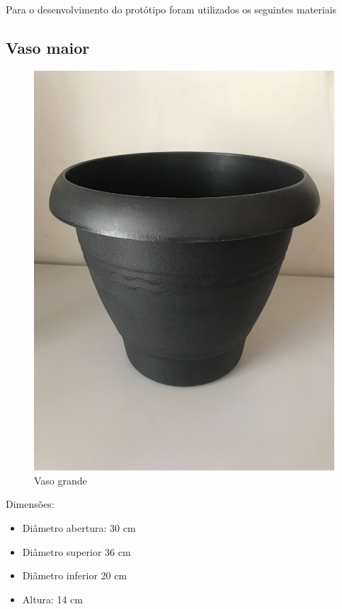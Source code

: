 \documentclass[
	12pt,				%
	openright,			%
	oneside,			%
	a4paper,			%
	chapter=TITLE,		%
	english,			%
	brazil				%
	]{abntex2}
\begin{document}
Para o desenvolvimento do protótipo foram utilizados os seguintes materiais


\subsection{Vaso maior}

\begin{figure}[H]
    \centering
    \includegraphics[scale=0.04, angle=-90]{imagens/IMG_0598.jpg}
    \caption{Vaso grande}
    \label{fig:vasomaior}
\end{figure}        
Dimensões: 

\begin{itemize}
    \item Diâmetro abertura: 30 cm
    \item Diâmetro superior 36 cm
    \item Diâmetro inferior 20 cm
    \item Altura: 14 cm
\end{itemize}
\end{document}
